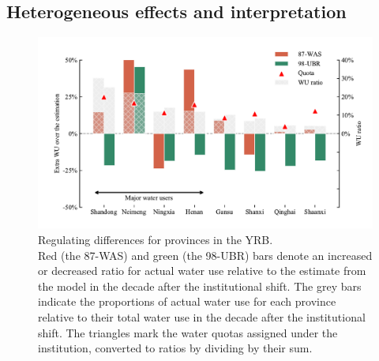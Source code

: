 \documentclass[preprint, 12pt]{elsarticle}
\begin{document}
\subsection{Heterogeneous effects and interpretation}\label{result-3}

\begin{figure}[!htb]
	\centering
	\includegraphics[width=0.9\linewidth]{outputs/fig3.pdf}
	\caption{
		Regulating differences for provinces in the YRB.\\
		Red (the 87-WAS) and green (the 98-UBR) bars denote an increased or decreased ratio for actual water use relative to the estimate from the model in the decade after the institutional shift.
		The grey bars indicate the proportions of actual water use for each province relative to their total water use in the decade after the institutional shift.
		The triangles mark the water quotas assigned under the institution, converted to ratios by dividing by their sum.
	}\label{fig:regulating}
\end{figure}
\end{document}
